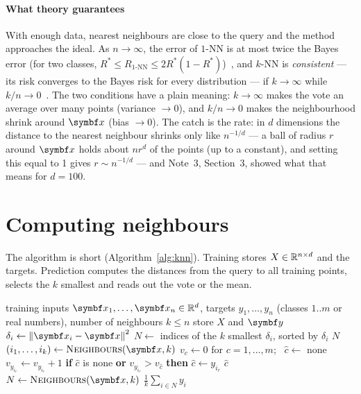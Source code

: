 \documentclass[11pt]{article}
\begin{document}
\paragraph{What theory guarantees} With enough data, nearest neighbours are close to the query and the method
approaches the ideal. As $n \to \infty$, the error of $1$-NN is at most twice the Bayes error (for two classes,
$R^* \le R_{1\text{-NN}} \le 2R^*(1 - R^*)$)~\cite{cover1967}, and $k$-NN is \emph{consistent} --- its risk converges to
the Bayes risk for every distribution --- if $k \to \infty$ while $k/n \to 0$~\cite{stone1977}. The two conditions
have a plain meaning: $k \to \infty$ makes the vote an average over many points (variance $\to 0$), and $k/n \to 0$
makes the neighbourhood shrink around $\x$ (bias $\to 0$). The catch is the rate: in $d$ dimensions the distance to
the nearest neighbour shrinks only like $n^{-1/d}$ --- a ball of radius $r$ around $\x$ holds about $n r^d$ of the
points (up to a constant), and setting this equal to 1 gives $r \sim n^{-1/d}$ --- and Note~3, Section~3, showed what
that means for $d = 100$.

\section{Computing neighbours}\label{sec:compute}

The algorithm is short (Algorithm~\ref{alg:knn}). Training stores $X \in \mathbb{R}^{n \times d}$ and the targets. Prediction
computes the distances from the query to all training points, selects the $k$ smallest and reads out the vote or the
mean.

\begin{algorithm}[htbp]
\caption{$k$-nearest neighbours, brute force: classification and regression}
\label{alg:knn}
\begin{algorithmic}[1]
\Require training inputs $\x_1, \dots, \x_n \in \R^d$, targets $y_1, \dots, y_n$ (classes $1..m$ or real numbers),
number of neighbours $k \le n$
  \State store $X$ and $\vect{y}$ 
\EndFunction
{}
    \State $\delta_i \gets \norm{\x_i - \x}^2$ 
  \EndFor
  \State $N \gets$ indices of the $k$ smallest $\delta_i$, sorted by $\delta_i$ 
  \State \Return $N$
\EndFunction
{}
  \State $(i_1, \dots, i_k) \gets \Call{Neighbours}{\x, k}$
  \State $v_c \gets 0$ for $c = 1, \dots, m$; \ $\hat c \gets$ none 
    \State $v_{y_{i_r}} \gets v_{y_{i_r}} + 1$ 
    \State \textbf{if} $\hat c$ is none \textbf{or} $v_{y_{i_r}} > v_{\hat c}$ \textbf{then} $\hat c \gets y_{i_r}$
  \EndFor
  \State \Return $\hat c$ 
\EndFunction
{}
  \State $N \gets \Call{Neighbours}{\x, k}$
  \State \Return $\frac{1}{k} \sum_{i \in N} y_i$
\EndFunction
\end{algorithmic}
\end{algorithm}
\end{document}
